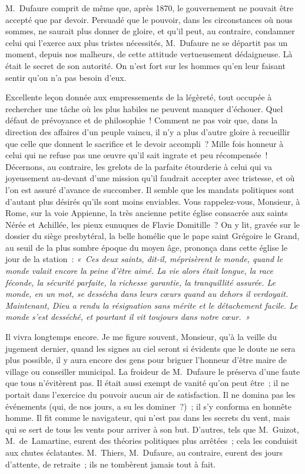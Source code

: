 \documentclass[french,twoside]{book} %
\newcommand\persName[1]{#1}
\newcommand\placeName[1]{#1}
\begin{document}
{\persName M. Dufaure} comprit de même que, après 1870, le gouvernement ne pouvait être accepté que par devoir. Persuadé que le pouvoir, dans les circonstances où nous sommes, ne saurait plus donner de gloire, et qu’il peut, au contraire, condamner celui qui l’exerce aux plus tristes nécessités, {\persName M. Dufaure} ne se départit pas un moment, depuis nos malheurs, de cette attitude vertueusement dédaigneuse. Là était le secret de son autorité. On n’est fort sur les hommes qu’en leur faisant sentir qu’on n’a pas besoin d’eux.\par
Excellente leçon donnée aux empressements de la légèreté, tout occupée à rechercher une tâche où les plus habiles ne peuvent manquer d’échouer. Quel défaut de prévoyance et de philosophie ! Comment ne pas voir que, dans la direction des affaires d’un peuple vaincu, il n’y a plus d’autre gloire à recueillir que celle que donnent le sacrifice et le devoir accompli ? Mille fois honneur à celui qui ne refuse pas une œuvre qu’il sait ingrate et peu récompensée ! Décernons, au contraire, les grelots de la parfaite étourderie à celui qui va joyeusement au-devant d’une mission qu’il faudrait accepter avec tristesse, et où l’on est assuré d’avance de succomber. Il semble que les mandats politiques sont d’autant plus désirés qu’ils sont moins enviables. Vous rappelez-vous, Monsieur, à {\placeName Rome}, sur la {\placeName voie Appienne}, la très ancienne petite église consacrée aux saints {\persName Nérée} et {\persName Achillée}, les pieux eunuques de {\persName Flavie Domitille} ? On y lit, gravée sur le dossier du siège presbytéral, la belle homélie que le {\persName pape saint Grégoire le Grand}, au seuil de la plus sombre époque du moyen âge, prononça dans cette église le jour de la station : \emph{« Ces deux saints, dit-il, méprisèrent le monde, quand le monde valait encore la peine d’être aimé. La vie alors était longue, la race féconde, la sécurité parfaite, la richesse garantie, la tranquillité assurée. Le monde, en un mot, se dessécha dans leurs cœurs quand au dehors il verdoyait. Maintenant, Dieu a rendu la résignation sans mérite et le détachement facile. Le monde s’est desséché, et pourtant il vit toujours dans notre cœur. »}\par
Il vivra longtemps encore. Je me figure souvent, Monsieur, qu’à la veille du jugement dernier, quand les signes au ciel seront si évidents que le doute ne sera plus possible, il y aura encore des gens pour briguer l’honneur d’être maire de village ou conseiller municipal. La froideur de {\persName M. Dufaure} le préserva d’une faute que tous n’évitèrent pas. Il était aussi exempt de vanité qu’on peut être ; il ne portait dans l’exercice du pouvoir aucun air de satisfaction. Il ne domina pas les événements (qui, de nos jours, a su les dominer ?) ; il s’y conforma en honnête homme. Il fit comme le navigateur, qui n’est pas dans les secrets du vent, mais qui se sert de tous les vents pour arriver à son but. D’autres, tels que {\persName M. Guizot}, {\persName M. de Lamartine}, eurent des théories politiques plus arrêtées ; cela les conduisit aux chutes éclatantes. {\persName M. Thiers}, {\persName M. Dufaure}, au contraire, eurent des jours d’attente, de retraite ; ils ne tombèrent jamais tout à fait.\par
\end{document}
